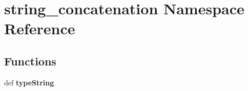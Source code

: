 \section{string\_\-concatenation Namespace Reference}
\label{namespacestring__concatenation}


\subsection*{Functions}
\begin{CompactItemize}
\item 
def {\bf type\-String}\label{namespacestring__concatenation_e60e145ee9715c83b7e0185b59cef81e}

\end{CompactItemize}

